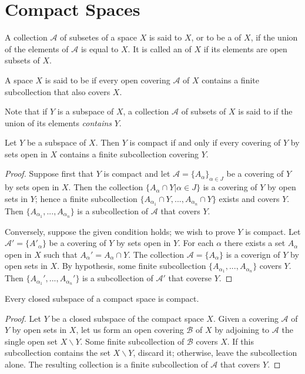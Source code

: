 \documentclass[12pt, a4paper, oneside, openright, titlepage]{book}
\begin{document}
\section{Compact Spaces}

\begin{definition}
    A collection $\mathcal{A}$ of subsetes of a space $X$ is said to  $X$, or to be a  of $X$, if the union of the elements of $\mathcal{A}$ is equal to $X$. It is called an  of $X$ if its elements are open subsets of $X$.
\end{definition}

\begin{definition}
    A space $X$ is said to be  if every open covering $\mathcal{A}$ of $X$ contains a finite subcollection that also covers $X$.
\end{definition}


Note that if $Y$ is a subspace of $X$, a collection $\mathcal{A}$ of subsets of $X$ is said to  if the union of its elements \emph{contains} $Y$.

\begin{lemma}
     Let $Y$ be a subspace of $X$. Then $Y$ is compact if and only if every covering of $Y$ by sets open in $X$ contains a finite subcollection covering $Y$.
\end{lemma}
\begin{proof}
    Suppose first that $Y$ is compact and let $\mathcal{A} = \{A_{\alpha}\}_{\alpha \in J}$ be a covering of $Y$ by sets open in $X$. Then the collection $\{A_{\alpha} \cap Y\vert \alpha \in J\}$ is a covering of $Y$ by open sets in $Y$; hence a finite subcollection $\{A_{\alpha_1}\cap Y,...,A_{\alpha_n}\cap Y\}$ exists and covers $Y$. Then $\{A_{\alpha_1},...,A_{\alpha_n}\}$ is a subcollection of $\mathcal{A}$ that covers $Y$.

    Conversely, suppose the given condition holds; we wish to prove $Y$ is compact. Let $\mathcal{A}' = \{A'_{\alpha}\}$ be a covering of $Y$ by sets open in $Y$. For each $\alpha$ there exists a set $A_{\alpha}$ open in $X$ such that $A_{\alpha}' = A_{\alpha}\cap Y$. The collection $\mathcal{A} = \{A_{\alpha}\}$ is a coverign of $Y$ by open sets in $X$. By hypothesis, some finite subcollection $\{A_{\alpha_1},...,A_{\alpha_n}\}$ covers $Y$. Then $\{A_{\alpha_1}',...,A_{\alpha_n}'\}$ is a subcollection of $\mathcal{A}'$ that coverse $Y$.
\end{proof}

\begin{theorem}
    Every closed subspace of a compact space is compact.
\end{theorem}
\begin{proof}
    Let $Y$ be a closed subspace of the compact space $X$. Given a covering $\mathcal{A}$ of $Y$ by open sets in $X$, let us form an open covering $\mathcal{B}$ of $X$ by adjoining to $\mathcal{A}$ the single open set $X\backslash Y$. Some finite subcollection of $\mathcal{B}$ covers $X$. If this subcollection contains the set $X\backslash Y$, discard it; otherwise, leave the subcollection alone. The resulting collection is a finite subcollection of $\mathcal{A}$ that covers $Y$.
\end{proof}
\end{document}
